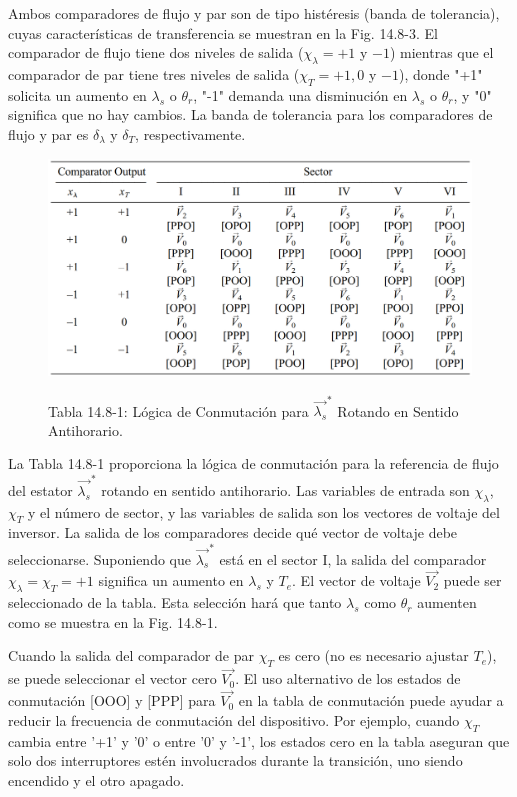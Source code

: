 \documentclass[letterpaper,12pt]{article}
\begin{document}
Ambos comparadores de flujo y par son de tipo histéresis (banda de tolerancia), cuyas características de transferencia se muestran en la Fig. 14.8-3. El comparador de flujo tiene dos niveles de salida ($\chi_\lambda = +1$ y $-1$) mientras que el comparador de par tiene tres niveles de salida ($\chi_T = +1, 0$ y $-1$), donde "+1" solicita un aumento en $\lambda_s$ o $\theta_r$, "-1" demanda una disminución en $\lambda_s$ o $\theta_r$, y "0" significa que no hay cambios. La banda de tolerancia para los comparadores de flujo y par es $\delta_\lambda$ y $\delta_T$, respectivamente.

\begin{figure}[ht]
\centering
\caption{Tabla 14.8-1: Lógica de Conmutación para $\vec{\lambda_s}^*$ Rotando en Sentido Antihorario.}
\includegraphics[scale=0.4]{graficos/tabla_14_8_1.png}
\label{tab:14.8-1}
\end{figure}
\FloatBarrier

La Tabla 14.8-1 proporciona la lógica de conmutación para la referencia de flujo del estator $\vec{\lambda_s}^*$ rotando en sentido antihorario. Las variables de entrada son $\chi_\lambda$, $\chi_T$ y el número de sector, y las variables de salida son los vectores de voltaje del inversor. La salida de los comparadores decide qué vector de voltaje debe seleccionarse. Suponiendo que $\vec{\lambda_s}^*$ está en el sector I, la salida del comparador $\chi_\lambda = \chi_T = +1$ significa un aumento en $\lambda_s$ y $T_e$. El vector de voltaje $\vec{V_2}$ puede ser seleccionado de la tabla. Esta selección hará que tanto $\lambda_s$ como $\theta_r$ aumenten como se muestra en la Fig. 14.8-1.

Cuando la salida del comparador de par $\chi_T$ es cero (no es necesario ajustar $T_e$), se puede seleccionar el vector cero $\vec{V_0}$. El uso alternativo de los estados de conmutación [OOO] y [PPP] para $\vec{V_0}$ en la tabla de conmutación puede ayudar a reducir la frecuencia de conmutación del dispositivo. Por ejemplo, cuando $\chi_T$ cambia entre '+1' y '0' o entre '0' y '-1', los estados cero en la tabla aseguran que solo dos interruptores estén involucrados durante la transición, uno siendo encendido y el otro apagado.
\end{document}
